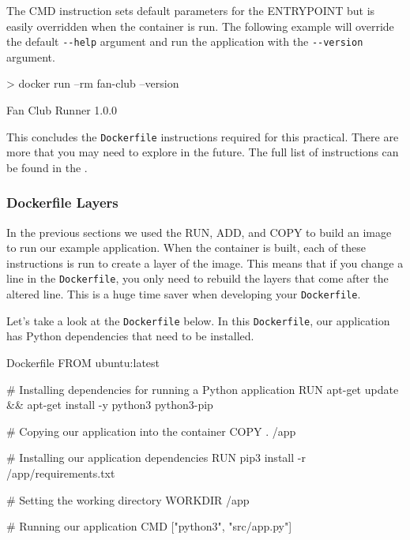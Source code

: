 \documentclass{csse4400}
\begin{document}
The CMD instruction sets default parameters for the ENTRYPOINT but is easily overridden when the container is run.
The following example will override the default \texttt{-{}-help} argument
and run the application with the \texttt{-{}-version} argument.

\begin{code}[language=shell,numbers=none]{}
> docker run --rm fan-club --version
\end{code}

\begin{code}[language=shell,numbers=none]{}
  Fan Club Runner 1.0.0
\end{code}


This concludes the \texttt{Dockerfile} instructions required for this practical.
There are more that you may need to explore in the future.
The full list of instructions can be found in the
.

\subsubsection{Dockerfile Layers}

In the previous sections we used the RUN, ADD, and COPY to build an image to run our example application.
When the container is built, each of these instructions is run to create a layer of the image.
This means that if you change a line in the \texttt{Dockerfile},
you only need to rebuild the layers that come after the altered line.
This is a huge time saver when developing your \texttt{Dockerfile}.

Let's take a look at the \texttt{Dockerfile} below.
In this \texttt{Dockerfile}, our application has Python dependencies that need to be installed.

\begin{code}[language=docker,numbers=none]{Dockerfile}
FROM ubuntu:latest

# Installing dependencies for running a Python application
RUN apt-get update && apt-get install -y python3 python3-pip

# Copying our application into the container
COPY . /app

# Installing our application dependencies
RUN pip3 install -r /app/requirements.txt

# Setting the working directory
WORKDIR /app

# Running our application
CMD ["python3", "src/app.py"]
\end{code}
\end{document}
